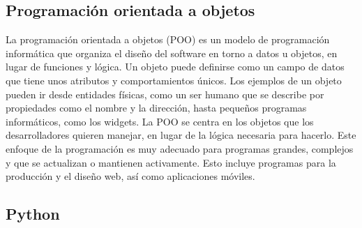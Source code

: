 \subsection{Programación orientada a objetos}

\begin{list}{}%
    {\setlength{\leftmargin}{1cm}\setlength{\rightmargin}{1cm}}
    \item\relax
    \small

La programación orientada a objetos (POO) es un modelo de programación informática que organiza el diseño del software en torno a datos u objetos, en lugar de funciones y lógica. Un objeto puede definirse como un campo de datos que tiene unos atributos y comportamientos únicos\cite{CitaD11}.
Los ejemplos de un objeto pueden ir desde entidades físicas, como un ser humano que se describe por propiedades como el nombre y la dirección, hasta pequeños programas informáticos, como los widgets\cite{CitaD11}.
La POO se centra en los objetos que los desarrolladores quieren manejar, en lugar de la lógica necesaria para hacerlo. Este enfoque de la programación es muy adecuado para programas grandes, complejos y que se actualizan o mantienen activamente\cite{CitaD11}.
Esto incluye programas para la producción y el diseño web, así como aplicaciones móviles\cite{CitaD11}.

\end{list}

\subsection{Python}

